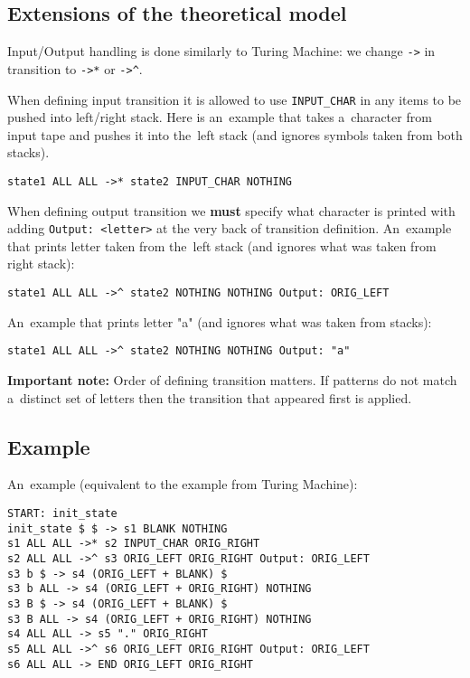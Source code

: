 \documentclass[english,shortabstract,mgr]{iithesis}
\begin{document}
\subsection {Extensions of the theoretical model}

Input/Output handling is done similarly to Turing Machine: we change \texttt{->} in transition
to \texttt{->*} or \texttt{->\^}.

When defining input transition it is allowed to use \texttt{INPUT\_CHAR} in any items
to be pushed into left/right stack. Here is an~example that takes a~character from input
tape and pushes it into the~left stack (and ignores symbols taken from both stacks).
\begin{verbatim}
state1 ALL ALL ->* state2 INPUT_CHAR NOTHING
\end{verbatim}

When defining output transition we \textbf{must} specify what character is printed
with adding \texttt{Output: <letter>} at the very back of transition definition.
An~example that prints letter taken from the~left stack (and ignores what was taken from right stack):
\begin{verbatim}
state1 ALL ALL ->^ state2 NOTHING NOTHING Output: ORIG_LEFT
\end{verbatim}
An~example that prints letter "a" (and ignores what was taken from stacks):
\begin{verbatim}
state1 ALL ALL ->^ state2 NOTHING NOTHING Output: "a"
\end{verbatim}

\textbf{Important note:} Order of defining transition matters. If patterns do not match
a~distinct set of letters then the transition that appeared first is applied.

\subsection{Example}

An~example (equivalent to the example from Turing Machine):
\begin{verbatim}
START: init_state
init_state $ $ -> s1 BLANK NOTHING
s1 ALL ALL ->* s2 INPUT_CHAR ORIG_RIGHT
s2 ALL ALL ->^ s3 ORIG_LEFT ORIG_RIGHT Output: ORIG_LEFT
s3 b $ -> s4 (ORIG_LEFT + BLANK) $
s3 b ALL -> s4 (ORIG_LEFT + ORIG_RIGHT) NOTHING
s3 B $ -> s4 (ORIG_LEFT + BLANK) $
s3 B ALL -> s4 (ORIG_LEFT + ORIG_RIGHT) NOTHING
s4 ALL ALL -> s5 "." ORIG_RIGHT
s5 ALL ALL ->^ s6 ORIG_LEFT ORIG_RIGHT Output: ORIG_LEFT
s6 ALL ALL -> END ORIG_LEFT ORIG_RIGHT
\end{verbatim}
\end{document}
